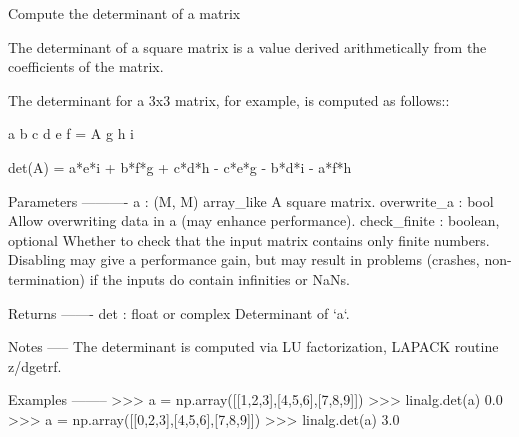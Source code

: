 \begin{DoxyVerb}Compute the determinant of a matrix

The determinant of a square matrix is a value derived arithmetically
from the coefficients of the matrix.

The determinant for a 3x3 matrix, for example, is computed as follows::

    a    b    c
    d    e    f = A
    g    h    i

    det(A) = a*e*i + b*f*g + c*d*h - c*e*g - b*d*i - a*f*h

Parameters
----------
a : (M, M) array_like
    A square matrix.
overwrite_a : bool
    Allow overwriting data in a (may enhance performance).
check_finite : boolean, optional
    Whether to check that the input matrix contains only finite numbers.
    Disabling may give a performance gain, but may result in problems
    (crashes, non-termination) if the inputs do contain infinities or NaNs.

Returns
-------
det : float or complex
    Determinant of `a`.

Notes
-----
The determinant is computed via LU factorization, LAPACK routine z/dgetrf.

Examples
--------
>>> a = np.array([[1,2,3],[4,5,6],[7,8,9]])
>>> linalg.det(a)
0.0
>>> a = np.array([[0,2,3],[4,5,6],[7,8,9]])
>>> linalg.det(a)
3.0\end{DoxyVerb}
 \hypertarget{namespacescipy_1_1linalg_1_1basic_ad2f6be11d92b6c15702a14760d933d53}{}
